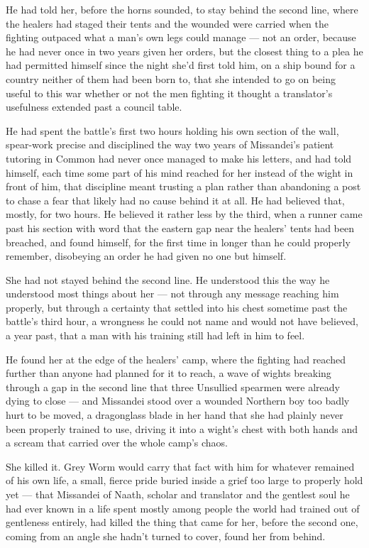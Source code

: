 He had told her, before the horns sounded, to stay behind the second line, where the healers had staged their tents and the wounded were carried when the fighting outpaced what a man’s own legs could manage — not an order, because he had never once in two years given her orders, but the closest thing to a plea he had permitted himself since the night she’d first told him, on a ship bound for a country neither of them had been born to, that she intended to go on being useful to this war whether or not the men fighting it thought a translator’s usefulness extended past a council table.

He had spent the battle’s first two hours holding his own section of the wall, spear-work precise and disciplined the way two years of Missandei’s patient tutoring in Common had never once managed to make his letters, and had told himself, each time some part of his mind reached for her instead of the wight in front of him, that discipline meant trusting a plan rather than abandoning a post to chase a fear that likely had no cause behind it at all. He had believed that, mostly, for two hours. He believed it rather less by the third, when a runner came past his section with word that the eastern gap near the healers’ tents had been breached, and found himself, for the first time in longer than he could properly remember, disobeying an order he had given no one but himself.

She had not stayed behind the second line. He understood this the way he understood most things about her — not through any message reaching him properly, but through a certainty that settled into his chest sometime past the battle’s third hour, a wrongness he could not name and would not have believed, a year past, that a man with his training still had left in him to feel.

He found her at the edge of the healers’ camp, where the fighting had reached further than anyone had planned for it to reach, a wave of wights breaking through a gap in the second line that three Unsullied spearmen were already dying to close — and Missandei stood over a wounded Northern boy too badly hurt to be moved, a dragonglass blade in her hand that she had plainly never been properly trained to use, driving it into a wight’s chest with both hands and a scream that carried over the whole camp’s chaos.

She killed it. Grey Worm would carry that fact with him for whatever remained of his own life, a small, fierce pride buried inside a grief too large to properly hold yet — that Missandei of Naath, scholar and translator and the gentlest soul he had ever known in a life spent mostly among people the world had trained out of gentleness entirely, had killed the thing that came for her, before the second one, coming from an angle she hadn’t turned to cover, found her from behind.

